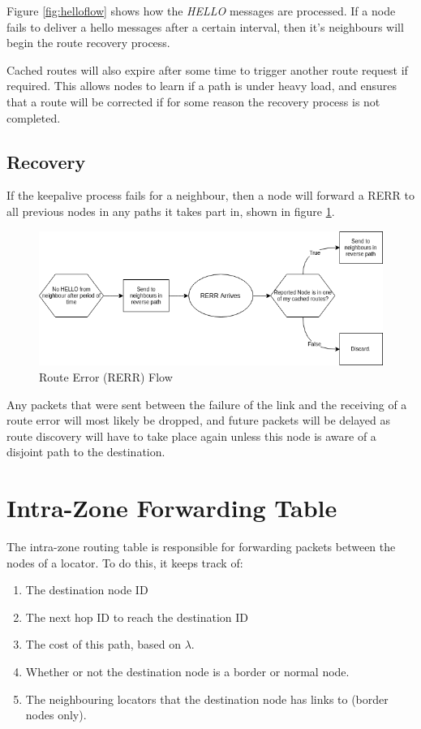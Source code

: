 \documentclass[12pt]{article}
\begin{document}
Figure \ref{fig:helloflow} shows how the \emph{HELLO} messages are processed. If a node fails to deliver a hello messages after a certain interval, then it's neighbours will begin the route recovery process.

Cached routes will also expire after some time to trigger another route request if required. This allows nodes to learn if a path is under heavy load, and ensures that a route will be corrected if for some reason the recovery process is not completed. 

\subsection{Recovery}

If the keepalive process fails for a neighbour, then a node will forward a RERR to all previous nodes in any paths it takes part in, shown in figure \ref{fig:rerrflow}.

\begin{figure}[h]
	\centering
	\includegraphics[width=\linewidth]{images/rerrflow}
	\caption{Route Error (RERR) Flow}
	\label{fig:rerrflow}
\end{figure}

Any packets that were sent between the failure of the link and the receiving of a route error will most likely be dropped, and future packets will be delayed as route discovery will have to take place again unless this node is aware of a disjoint path to the destination.

\section{Intra-Zone Forwarding Table}

The intra-zone routing table is responsible for forwarding packets between the nodes of a locator. To do this, it keeps track of:

\begin{enumerate}
	\item The destination node ID
	\item The next hop ID to reach the destination ID
	\item The cost of this path, based on $\lambda$.
	\item Whether or not the destination node is a border or normal node.
	\item The neighbouring locators that the destination node has links to (border nodes only).
\end{enumerate}
\end{document}
